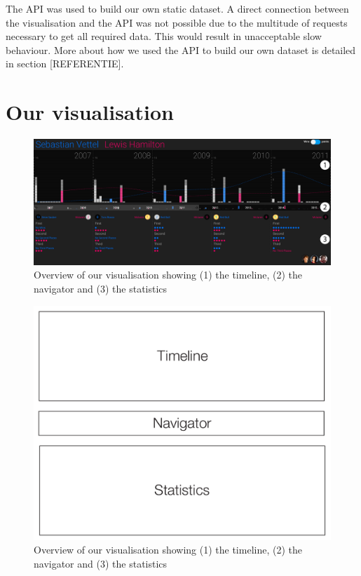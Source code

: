 \documentclass{sigchi}
\begin{document}
The API was used to build our own static dataset. A direct connection between the visualisation and the API was not possible due to the multitude of requests necessary to get all required data. This would result in unacceptable slow behaviour. More about how we used the API to build our own dataset is detailed in section [REFERENTIE]. 


\section{Our visualisation}
\begin{figure}[tp]
  \centering
  \includegraphics[width=1\textwidth]{images/overview.png}
  \caption{Overview of our visualisation showing (1) the timeline, (2) the navigator and (3) the statistics}
  \label{fig:overview}
\end{figure}


\begin{figure}[H]
  \centering
  \includegraphics[width=1\textwidth]{images/layout.pdf}
  \caption{Overview of our visualisation showing (1) the timeline, (2) the navigator and (3) the statistics}
  \label{fig:layout}
\end{figure}
\end{document}
